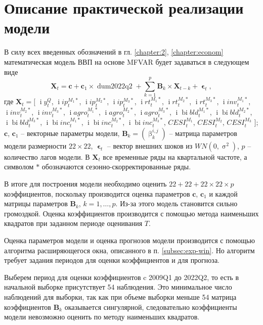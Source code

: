 \documentclass[a4paper, 14pt]{extreport}
\numberwithin{equation}{section}
\renewcommand{\beta}{\upbeta}
\renewcommand{\epsilon}{\upvarepsilon}
\renewcommand{\sigma}{\upsigma}
\renewcommand{\i}{\operatorname{i}}
\newcommand{\bi}{\operatorname{bi}}
\numberwithin{equation}{section}
\begin{document}
	\section{Описание практической реализации модели}
	\label{sec:pract-realise}
	
	В силу всех введенных обозначений в гл. \ref{chapter:2}, \ref{chapter:econom} математическая модель ВВП на основе MFVAR будет задаваться в следующем виде
	\begin{equation}
		\label{eq:mfvar-1}
		\mathbf X_t = \mathbf c + \mathbf c_1 \times \operatorname{dum2022q2} + \sum_{k=1}^{p}\mathbf B_k \times \mathbf X_{t-k} + \mathbf \epsilon_t,
	\end{equation}
	где
	$\mathbf X_t = \Big[$
			$\i y_t^{Q}$,
			$\i ip_{t}^{M_1*}$,
			$\i ip_{t}^{M_2*}$,
			$\i ip_{t}^{M_3*}$,
			$\i rt_{t}^{M_1*}$,
			$\i rt_{t}^{M_2*}$,
			$\i rt_{t}^{M_3*}$,
			$\i inv_{t}^{M_1*}$,
			$\i inv_{t}^{M_2*}$,
			$\i inv_{t}^{M_3*}$,
			$\i agro_{t}^{M_1*}$,
			$\i agro_{t}^{M_2*}$,
			$\i agro_{t}^{M_3*}$,
			$\i \bi bld_{t}^{M_1*}$,
			$\i \bi bld_{t}^{M_2*}$,
			$\i \bi bld_{t}^{M_3*}$,
			$\i \bi inc_{t}^{M_1*}$,
			$\i \bi inc_{t}^{M_2*}$,
			$\i \bi inc_{t}^{M_3*}$,
			$CESI_{t}^{M_1}$,
			$CESI_{t}^{M_2}$,
			$CESI_{t}^{M_3}$
			$\Big]$; $\mathbf c$, $\mathbf c_1$ -- векторные параметры модели, $\mathbf B_k = (\beta^{i,j}_k)$ -- матрица параметров модели размерности $22\times 22$, $\mathbf \epsilon_t$ -- вектор внешних шоков из $WN(0,\sigma^2)$, $p$ -- количество лагов модели. В $\mathbf X_t$ все временные ряды на квартальной частоте, а символом $*$ обозначаются сезонно-скорректированные ряды.
			
	В итоге для построения модели необходимо оценить $22 + 22 + 22\times22\times p$ коэффициентов, поскольку производится оценка параметров $\mathbf c$, $\mathbf c_1$ и каждой матрицы параметров $\mathbf B_k$, $k=1,\ldots,p$. Из-за этого модель становится сильно громоздкой. Оценка коэффициентов производится с помощью метода наименьших квадратов при заданном периоде оценивания $T$.
			
	Оценка параметров модели и оценка прогнозов модели производится с помощью алгоритма расширяющегося окна, описанного в п. \ref{subsec:exp-win}. Но алгоритм требует задания периодов для оценки коэффициентов и для прогноза. 
	
	Выберем период для оценки коэффициентов c 2009Q1 до 2022Q2, то есть в начальной выборке присутствует 54 наблюдения. Это минимальное число наблюдений для выборки, так как при объеме выборки меньше 54 матрица коэффициентов $\mathbf B_k$ оказывается сингулярной, следовательно коэффициенты модели невозможно оценить по методу наименьших квадратов.
	
\end{document}
